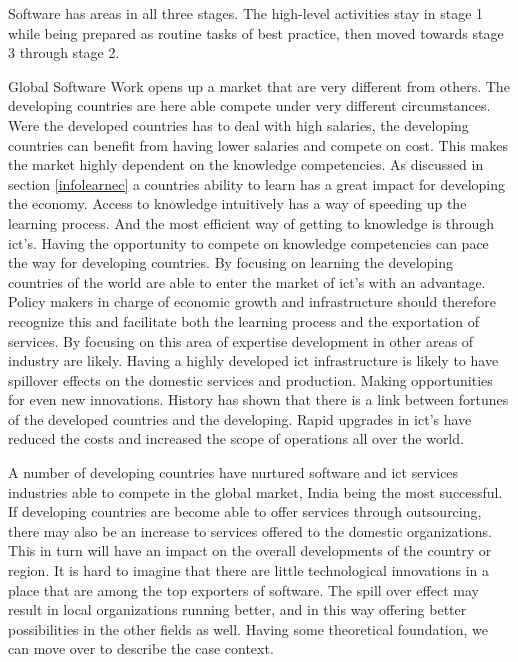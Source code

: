 Software has areas in all three stages. The high-level activities stay in stage 1 while being prepared as routine tasks of best practice, then moved towards stage 3 through stage 2.

Global Software Work opens up a market that are very different from others.
The developing countries are here able compete under very different circumstances.
Were the developed countries has to deal with high salaries, the developing countries can benefit from having lower salaries and compete on cost. 
This makes the market highly dependent on the knowledge competencies. 
As discussed in section \ref{infolearnec} a countries ability to learn has a great impact for developing the economy. 
Access to knowledge intuitively has a way of speeding up the learning process. And the most efficient way of getting to knowledge is through \gls{ict}'s. 
Having the opportunity to compete on knowledge competencies can pace the way for developing countries. 
By focusing on learning the developing countries of the world are able to enter the market of \gls{ict}'s with an advantage. 
Policy makers in charge of economic growth and infrastructure should therefore recognize this and facilitate both the learning process and the exportation of services. 
By focusing on this area of expertise development in other areas of industry are likely.
Having a highly developed \gls{ict} infrastructure is likely to have spillover effects on the domestic services and production. 
Making opportunities for even new innovations. 
History has shown that there is a link between fortunes of the developed countries and the developing. 
Rapid upgrades in \gls{ict}'s have reduced the costs and increased the scope of operations all over the world. 

A number of developing countries have nurtured software and \gls{ict} services industries able to compete in the global market, India being the most successful. 
If developing countries are become able to offer services through outsourcing, there may also be an increase to services offered to the domestic organizations. 
This in turn will have an impact on the overall developments of the country or region. 
It is hard to imagine that there are little technological innovations in a place that are among the top exporters of software. 
The spill over effect may result in local organizations running better, and in this way offering better possibilities in the other fields as well.
Having some theoretical foundation, we can move over to describe the case context.
\cite{ca:isdc}
\cite{sbs:gio}
\cite{offit:paan}

